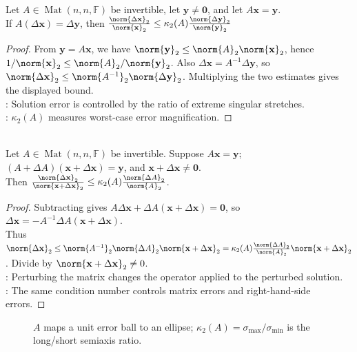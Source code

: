 \begin{theorem} \label{thm:linear-system-relative-error-condition-number} \\
Let $A\in\operatorname{Mat}(n,n,\mathbb{F})$ be invertible, let $\mathbf{y}\neq\mathbf{0}$, and let $A\mathbf{x}=\mathbf{y}$.\\
If $A(\Delta\mathbf{x})=\Delta\mathbf{y}$, then $\frac{\norm{\Delta\mathbf{x}}_2}{\norm{\mathbf{x}}_2} \leq \kappa_2(A)\frac{\norm{\Delta\mathbf{y}}_2}{\norm{\mathbf{y}}_2}$
\begin{proof}
From $\mathbf{y}=A\mathbf{x}$, we have $\norm{\mathbf{y}}_2\leq\norm{A}_2\norm{\mathbf{x}}_2$, hence $1/\norm{\mathbf{x}}_2\leq\norm{A}_2/\norm{\mathbf{y}}_2$. Also $\Delta\mathbf{x}=A^{-1}\Delta\mathbf{y}$, so $\norm{\Delta\mathbf{x}}_2\leq\norm{A^{-1}}_2\norm{\Delta\mathbf{y}}_2$. Multiplying the two estimates gives the displayed bound.\\
: Solution error is controlled by the ratio of extreme singular stretches.\\
: $\kappa_2(A)$ measures worst-case error magnification.
\end{proof}
\end{theorem}

\begin{theorem} \label{thm:matrix-perturbation-relative-error-condition-number} \\
Let $A\in\operatorname{Mat}(n,n,\mathbb{F})$ be invertible. Suppose $A\mathbf{x}=\mathbf{y}$; $(A+\Delta A)(\mathbf{x}+\Delta\mathbf{x})=\mathbf{y}$, and $\mathbf{x}+\Delta\mathbf{x}\neq\mathbf{0}$.\\
Then $\frac{\norm{\Delta\mathbf{x}}_2}{\norm{\mathbf{x}+\Delta\mathbf{x}}_2} \leq \kappa_2(A)\frac{\norm{\Delta A}_2}{\norm{A}_2}$.
\begin{proof}
Subtracting gives $A\Delta\mathbf{x}+\Delta A(\mathbf{x}+\Delta\mathbf{x})=\mathbf{0}$, so $\Delta\mathbf{x}=-A^{-1}\Delta A(\mathbf{x}+\Delta\mathbf{x})$.\\
Thus $\norm{\Delta\mathbf{x}}_2 \leq \norm{A^{-1}}_2\norm{\Delta A}_2\norm{\mathbf{x}+\Delta\mathbf{x}}_2 =\kappa_2(A)\frac{\norm{\Delta A}_2}{\norm{A}_2}\norm{\mathbf{x}+\Delta\mathbf{x}}_2$. Divide by $\norm{\mathbf{x}+\Delta\mathbf{x}}_2\neq0$.\\
: Perturbing the matrix changes the operator applied to the perturbed solution.\\
: The same condition number controls matrix errors and right-hand-side errors.
\end{proof}
\end{theorem}

\begin{figure}[H]
  \centering
  
  \caption{$A$ maps a unit error ball to an ellipse; $\kappa_2(A)=\sigma_{\max}/\sigma_{\min}$ is the long/short semiaxis ratio.}
  \label{fig:condition-number-error-bound}
\end{figure}
